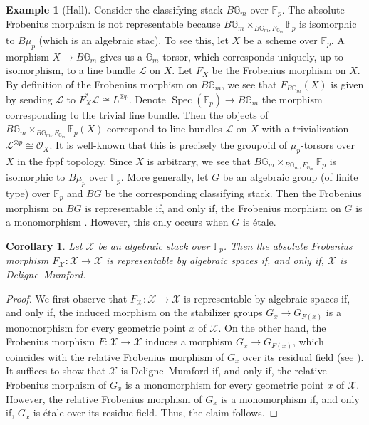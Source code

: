\documentclass[11pt]{amsart}
\theoremstyle{plain}
\newtheorem{corollary}[theorem]{Corollary}
\theoremstyle{definition}
\newtheorem{example}[theorem]{Example}
\numberwithin{equation}{section}
\numberwithin{theorem}{section}
\begin{document}
\begin{example}
    [Hall]
    \label{ex:nonrepresentability}
    Consider the classifying stack $B\mathbb{G}_{m}$ over $\mathbb{F}_p$. 
    The absolute Frobenius morphism is not representable because $B\mathbb{G}_{m}\times_{B\mathbb{G}_m, F_{\mathbb{G}_m}}\mathbb{F}_p$ is isomorphic to $B\mu_p$ (which is an algebraic stac). 
    To see this, let $X$ be a scheme over $\mathbb{F}_p$. 
    A morphism $X\to B\mathbb{G}_m$ gives us a $\mathbb{G}_m$-torsor, which corresponds uniquely, up to isomorphism, to a line bundle $\mathcal{L}$ on $X$. 
    Let $F_X$ be the Frobenius morphism on $X$. 
    By definition of the Frobenius morphism on $B\mathbb{G}_m$, we see that $F_{B\mathbb{G}_m}(X)$ is given by sending $\mathcal{L}$ to $F_{X}^{\ast}\mathcal{L}\cong L^{\otimes p}$. 
    Denote $\operatorname{Spec}(\mathbb{F}_p)\to B\mathbb{G}_m$ the morphism corresponding to the trivial line bundle. 
    Then the objects of $B\mathbb{G}_{m}\times_{B\mathbb{G}_m, F_{\mathbb{G}_m}}\mathbb{F}_p(X)$ correspond to line bundles $\mathcal{L}$ on $X$ with a trivialization $\mathcal{L}^{\otimes p}\cong\mathcal{O}_X$. 
    It is well-known that this is precisely the groupoid of $\mu_p$-torsors over $X$ in the fppf topology. 
    Since $X$ is arbitrary, we see that $B\mathbb{G}_{m}\times_{B\mathbb{G}_m, F_{\mathbb{G}_m}}\mathbb{F}_p$ is isomorphic to $B\mu_p$ over $\mathbb{F}_p$. 
    More generally, let $G$ be an algebraic group (of finite type) over $\mathbb{F}_p$ and $BG$ be the corresponding classifying stack. 
    Then the Frobenius morphism on $BG$ is representable if, and only if, the Frobenius morphism on $G$ is a monomorphism \cite[Warning\ 3.1.3]{Olsson:2007}. However, this only occurs when $G$ is \'{e}tale.
\end{example}

\begin{corollary}
    \label{cor:Frobenius_for_DM_is_representable}
    Let $\mathcal{X}$ be an algebraic stack over $\mathbb{F}_p$. 
    Then the absolute Frobenius morphism $F_\mathcal{X}\colon\mathcal{X}\to\mathcal{X}$ is representable by algebraic spaces if, and only if, $\mathcal{X}$ is Deligne--Mumford. 
\end{corollary}

\begin{proof}
    We first observe that $F_\mathcal{X}\colon \mathcal{X} \to \mathcal{X}$ is representable by algebraic spaces if, and only if, the induced morphism on the stabilizer groups $G_x \to G_{F(x)}$ is a monomorphism for every geometric point $x$ of $\mathcal{X}$. 
    On the other hand, the Frobenius morphism $F\colon \mathcal{X} \to \mathcal{X}$ induces a morphism $G_x \to G_{F(x)}$, which coincides with the relative Frobenius morphism of $G_x$ over its residual field (see ). It suffices to show that $\mathcal{X}$ is Deligne--Mumford if, and only if, the relative Frobenius morphism of $G_x$ is a monomorphism for every geometric point $x$ of $\mathcal{X}$. 
    However, the relative Frobenius morphism of $G_x$ is a monomorphism if, and only if, $G_x$ is \'etale over its residue field. Thus, the claim follows.
\end{proof}
\end{document}
